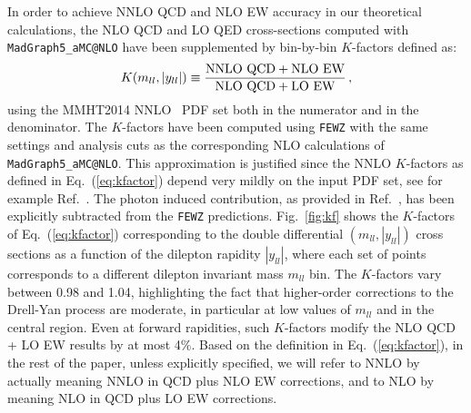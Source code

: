 %
In order to achieve NNLO QCD and NLO EW accuracy in our theoretical
calculations, the NLO QCD and LO QED cross-sections computed with
{\tt MadGraph5{\_}aMC@NLO}
have been supplemented by bin-by-bin $K$-factors
defined as:
\begin{equation}
  \label{eq:kfactor}
  K(m_{ll},|y_{ll}|) \equiv\frac{\rm NNLO\  QCD  + NLO\  EW}{\rm NLO\  QCD + LO\  EW} \, ,
\end{equation}
using the MMHT2014 NNLO~\cite{Harland-Lang:2014zoa} PDF set both in
the numerator and in the denominator. The $K$-factors have been
computed using {\tt FEWZ} with the same settings and analysis cuts as
the corresponding NLO calculations of {\tt MadGraph5{\_}aMC@NLO}. This
approximation is justified since the NNLO $K$-factors as defined in
Eq.~(\ref{eq:kfactor}) depend very mildly on the input PDF set, see
for example Ref.~\cite{Czakon:2016olj}. The photon induced
contribution, as provided in Ref.~\cite{Aad:2016zzw}, has been
explicitly subtracted from the {\tt FEWZ}
predictions. Fig.~\ref{fig:kf} shows the $K$-factors of
Eq.~(\ref{eq:kfactor}) corresponding to the double differential
$(m_{ll},|y_{ll}|)$ cross sections as a function of the dilepton
rapidity $|y_{ll}|$, where each set of points corresponds to a
different dilepton invariant mass $m_{ll}$ bin. The $K$-factors vary
between 0.98 and 1.04, highlighting the fact that higher-order
corrections to the Drell-Yan process are moderate, in particular at
low values of $m_{ll}$ and in the central region. Even at forward
rapidities, such $K$-factors modify the NLO QCD + LO EW results by at
most 4\%. Based on the definition in Eq.~(\ref{eq:kfactor}), in the
rest of the paper, unless explicitly specified, we will refer to NNLO
by actually meaning NNLO in QCD plus NLO EW corrections, and to NLO by
meaning NLO in QCD plus LO EW corrections.

